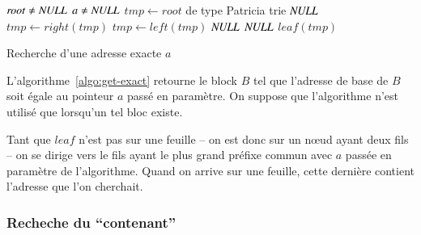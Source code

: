 \begin{algorithm}
\begin{algorithmic}
\Require $\mathit{root} \neq \mathit{NULL}$
\Require $a \neq \mathit{NULL}$
\State $\mathit{tmp} \gets \mathit{root}$ de type Patricia trie
    \Return $\mathit{NULL}$
  \EndIf
    \State $\mathit{tmp} \gets \mathit{right(tmp)}$
    \State $\mathit{tmp} \gets \mathit{left(tmp)}$
  \Else
    \Return $\mathit{NULL}$
  \EndIf
\EndWhile
{}
  \Return $\mathit{NULL}$
\Else
  \Return $\mathit{leaf(tmp)}$
\EndIf
\end{algorithmic}
\caption{Recherche d'une adresse exacte $a$
  \label{algo:get-exact}}
\end{algorithm}

L'algorithme~\ref{algo:get-exact} retourne le block $B$ tel que l'adresse de
base de $B$ soit égale au pointeur $a$ passé en paramètre.
On suppose que l'algorithme n'est utilisé que lorsqu'un tel bloc existe.

Tant que $\mathit{leaf}$ n'est pas sur une feuille -- on est donc sur un
n\oe{}ud ayant deux fils -- on se dirige vers le fils ayant le plus grand
préfixe commun avec $a$ passée en paramètre de l'algorithme.
Quand on arrive sur une feuille, cette dernière contient l'adresse que l'on
cherchait.

\subsubsection*{Recheche du ``contenant''}


